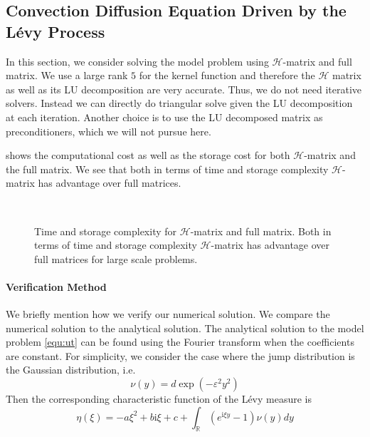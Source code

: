 \documentclass[10pt,a4paper]{article}
\newcommand{\ii}[0]{\mathrm{i}}
\newcommand{\RR}[0]{\mathbb{R}}
\theoremstyle{definition}
\begin{document}
\subsection{Convection Diffusion Equation Driven by the L\'evy Process}

In this section, we consider solving the model problem using $\mathcal{H}$-matrix and full matrix. We use a large rank $5$ for the kernel function and therefore the $\mathcal{H}$ matrix as well as its LU decomposition are very accurate. Thus, we do not need iterative solvers. Instead we can directly do triangular solve given the LU decomposition at each iteration. Another choice is to use the LU decomposed matrix as preconditioners, which we will not pursue here.  

 shows the computational cost as well as the storage cost for both $\mathcal{H}$-matrix and the full matrix. We see that both in terms of time and storage complexity $\mathcal{H}$-matrix has advantage over full matrices.

\begin{figure}[htpb]
\centering
\scalebox{0.3}{}~
\scalebox{0.3}{}

\caption{Time and storage complexity for $\mathcal{H}$-matrix and full matrix. Both in terms of time and storage complexity $\mathcal{H}$-matrix has advantage over full matrices for large scale problems.}
\label{fig:s}
\end{figure}



\paragraph{Verification Method} We briefly mention how we verify our numerical solution. We compare the numerical solution to the analytical solution. The analytical solution to the model problem \cref{equ:ut} can be found using the Fourier transform when the coefficients are constant. For simplicity, we consider the case where the jump distribution is the Gaussian distribution, i.e. 
\begin{equation}
	\nu(y) = d\exp(-\varepsilon^2 y^2)
\end{equation}
Then the corresponding characteristic function of the L\'evy measure is 
\begin{equation}
	\eta(\xi) = -a\xi^2 + b\ii \xi + c + \int_\RR (e^{\ii \xi y}-1)\nu(y)dy
\end{equation}
\end{document}
